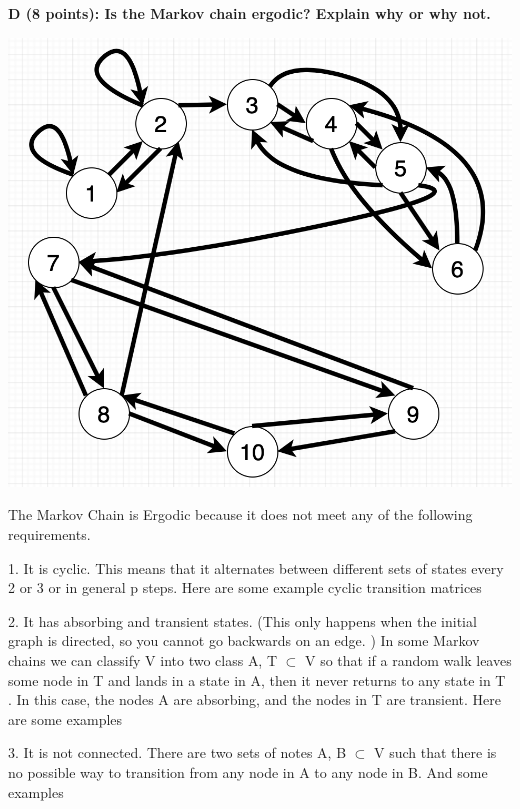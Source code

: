 \documentclass{report}
\begin{document}

\begin{flushleft}
\textbf{D (8 points): Is the Markov chain ergodic? Explain why or why not.}
\end{flushleft}

\includegraphics [width = 1 \textwidth] {Graph}

\begin{flushleft}
The Markov Chain is Ergodic because it does not meet any of the following requirements.

1. It is cyclic. This means that it alternates between different sets of states every 2 or 3 or in general p
steps. Here are some example cyclic transition matrices

2. It has absorbing and transient states. (This only happens when the initial graph is directed, so you cannot go backwards on an edge. ) In some Markov chains we can classify V into two class A, T $\subset$ V so that if a random walk leaves some node in T and lands in a state in A, then it never returns to any state in T . In this case, the nodes A are absorbing, and the nodes in T are transient. Here are some examples

3. It is not connected. There are two sets of notes A, B $\subset$ V such that there is no possible way to
transition from any node in A to any node in B. And some examples
\end{flushleft}
\end{document}
